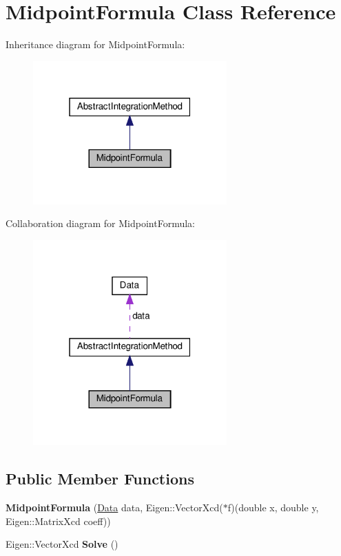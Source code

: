 \hypertarget{classMidpointFormula}{}\section{Midpoint\+Formula Class Reference}
\label{classMidpointFormula}


Inheritance diagram for Midpoint\+Formula\+:\nopagebreak
\begin{figure}[H]
\begin{center}
\leavevmode
\includegraphics[width=211pt]{classMidpointFormula__inherit__graph}
\end{center}
\end{figure}


Collaboration diagram for Midpoint\+Formula\+:\nopagebreak
\begin{figure}[H]
\begin{center}
\leavevmode
\includegraphics[width=211pt]{classMidpointFormula__coll__graph}
\end{center}
\end{figure}
\subsection*{Public Member Functions}
\begin{DoxyCompactItemize}
\item 
\mbox{\label{classMidpointFormula_ad3c444776b53996d50dbf88a61c36c8c}} 
{\bfseries Midpoint\+Formula} (\hyperlink{structData}{Data} data, Eigen\+::\+Vector\+Xcd($\ast$f)(double x, double y, Eigen\+::\+Matrix\+Xcd coeff))
\item 
\mbox{\label{classMidpointFormula_add437323dfb0bc181b0051c5aaf80ba7}} 
Eigen\+::\+Vector\+Xcd {\bfseries Solve} ()
\end{DoxyCompactItemize}
